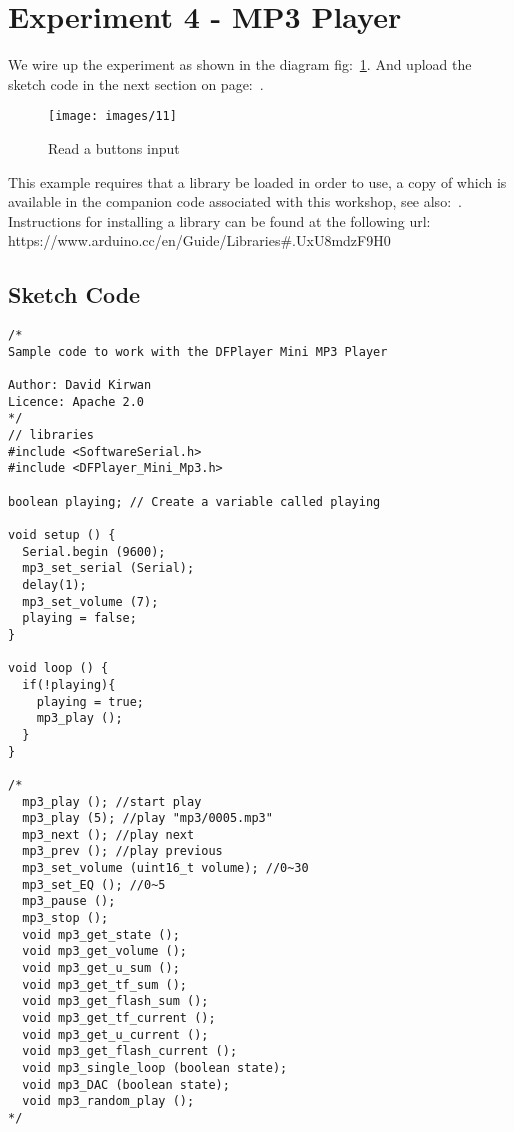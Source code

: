 \chapter*{Experiment 4 - MP3 Player}
We wire up the experiment as shown in the diagram fig:~\ref{fig:exp4_mp3}. And upload the sketch code in the next section on page:~\pageref{sketch:exp4}.

%
\begin{figure}[ht]
	\centering
	\texttt{[image: images/11]}
	\caption{Read a buttons input \citep{dfrobot-15a}}
	\label{fig:exp4_mp3}
\end{figure}
%

This example requires that a library be loaded in order to use, a copy of which is available in the companion code associated with this workshop, see also:~\citep{dfrobot-15b}. Instructions for installing a library can be found at the following url: https://www.arduino.cc/en/Guide/Libraries\#.UxU8mdzF9H0 

\newpage
\section*{Sketch Code}
\label{sketch:exp4}
\begin{lstlisting}
/*
Sample code to work with the DFPlayer Mini MP3 Player

Author: David Kirwan
Licence: Apache 2.0
*/
// libraries
#include <SoftwareSerial.h>
#include <DFPlayer_Mini_Mp3.h>

boolean playing; // Create a variable called playing

void setup () {
  Serial.begin (9600);
  mp3_set_serial (Serial);
  delay(1);
  mp3_set_volume (7);
  playing = false;
}

void loop () {
  if(!playing){
    playing = true;
    mp3_play ();
  }
}

/*
  mp3_play (); //start play
  mp3_play (5); //play "mp3/0005.mp3"
  mp3_next (); //play next
  mp3_prev (); //play previous
  mp3_set_volume (uint16_t volume); //0~30
  mp3_set_EQ (); //0~5
  mp3_pause ();
  mp3_stop ();
  void mp3_get_state ();
  void mp3_get_volume ();
  void mp3_get_u_sum ();
  void mp3_get_tf_sum ();
  void mp3_get_flash_sum ();
  void mp3_get_tf_current ();
  void mp3_get_u_current ();
  void mp3_get_flash_current ();
  void mp3_single_loop (boolean state);
  void mp3_DAC (boolean state);
  void mp3_random_play ();
*/

\end{lstlisting}